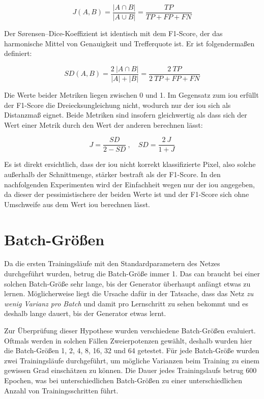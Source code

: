 \begin{equation}
J(A, B) = \frac{| A \cap B |}{| A \cup B |} = \frac{TP}{TP + FP + FN}
\end{equation}

Der Sørensen–Dice-Koeffizient ist identisch mit dem F1-Score, der das harmonische Mittel von Genauigkeit und Trefferquote ist.
Er ist folgendermaßen definiert:

\begin{equation}
SD(A, B) = \frac{2 \ | A \cap B |}{| A | + | B |} = \frac{2 \ TP}{2 \ TP + FP + FN}
\end{equation}

Die Werte beider Metriken liegen zwischen 0 und 1.
Im Gegensatz zum \gls{iou} erfüllt der F1-Score die Dreiecksungleichung nicht, wodurch nur der \gls{iou} sich als Distanzmaß eignet.
Beide Metriken sind insofern gleichwertig als dass sich der Wert einer Metrik durch den Wert der anderen berechnen lässt:

\begin{equation}
J = \frac{SD}{2 - SD} \ , \quad SD = \frac{2 \ J}{1 + J}
\end{equation}

Es ist direkt ersichtlich, dass der \gls{iou} nicht korrekt klassifizierte Pixel, also solche außerhalb der Schnittmenge, stärker bestraft als der F1-Score.
In den nachfolgenden Experimenten wird der Einfachheit wegen nur der \gls{iou} angegeben, da dieser der pessimistischere der beiden Werte ist und der F1-Score sich ohne Umschweife aus dem Wert \gls{iou} berechnen lässt.



\section{Batch-Größen}

Da die ersten Trainingsläufe mit den Standardparametern des Netzes durchgeführt wurden, betrug die Batch-Größe immer 1.
Das \gls{can} braucht bei einer solchen Batch-Größe sehr lange, bis der Generator überhaupt anfängt etwas zu lernen.
Möglicherweise liegt die Ursache dafür in der Tatsache, dass das Netz \emph{zu wenig Varianz pro Batch} und damit pro Lernschritt zu sehen bekommt und es deshalb lange dauert, bis der Generator etwas lernt.

Zur Überprüfung dieser Hypothese wurden verschiedene Batch-Größen evaluiert.
Oftmals werden in solchen Fällen Zweierpotenzen gewählt, deshalb wurden hier die Batch-Größen 1, 2, 4, 8, 16, 32 und 64 getestet.
Für jede Batch-Größe wurden zwei Trainingsläufe durchgeführt, um mögliche Varianzen beim Training zu einem gewissen Grad einschätzen zu können.
Die Dauer jedes Trainingslaufs betrug 600 Epochen, was bei unterschiedlichen Batch-Größen zu einer unterschiedlichen Anzahl von Trainingsschritten führt.

